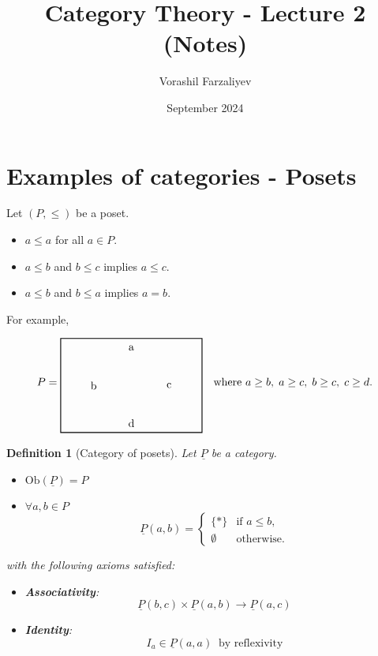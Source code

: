 \documentclass{article}
\title{Category Theory - Lecture 2 (Notes)}
\author{Vorashil Farzaliyev}
\date{September 2024}
\newtheorem{definition}{Definition}[section]
\begin{document}
    \maketitle


    \section{Examples of categories - Posets}

    Let $(P, \leq)$ be a poset.
    \begin{itemize}
        \item $a \leq a$ for all $a \in P$.
        \item $a \leq b$ and $b \leq c$ implies $a \leq c$.
        \item $a \leq b$ and $b \leq a$ implies $a = b$.
    \end{itemize}
    For example,

    \[
        P =
        \begin{tikzpicture}
            [baseline={(current bounding box.center)}, scale=1.5]
            \draw[thick] (0,0) rectangle (3,2);

            \node at (1.5, 1.8) {a};  %
            \node at (0.7, 1) {b};     %
            \node at (2.3, 1) {c};     %
            \node at (1.5, 0.2) {d};  %
        \end{tikzpicture}
        \quad \text{where } a \geq b, \; a \geq c, \; b \geq c, \; c \geq d.
    \]

    \begin{definition}[Category of posets]
        Let $\underline{P}$ be a category.
        \begin{itemize}
            \item $\text{Ob}(\underline{P}) = P$
            \item $\forall a, b \in P$
            \[
                \underline{P}(a, b) =
                \begin{cases}
                    \{*\} & \text{if } a \leq b, \\
                    \emptyset & \text{otherwise}.
                \end{cases}
            \]
        \end{itemize}
        with the following axioms satisfied:
        \begin{itemize}
            \item \textbf{Associativity}:
            \[
                \underline{P}(b,c)\times \underline{P}(a,b) \to \underline{P}(a,c)
            \]
            \item \textbf{Identity}:
            \[
                I_a \in \underline{P}(a,a) \ \text{ by reflexivity}
            \]
        \end{itemize}
    \end{definition}
\end{document}
